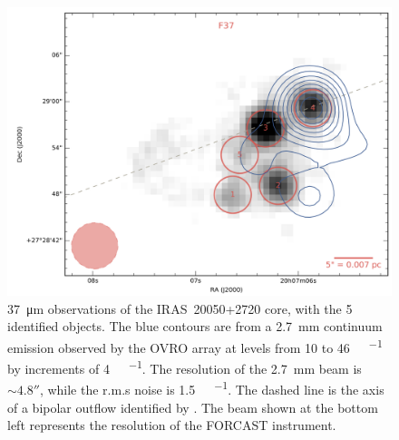 \begin{figure}
\begin{center}
\includegraphics[width=\textwidth]{Figures/IRAS20050_core.png}
\caption[IRAS~20050+2720 core]{\SI{37}{\um} observations of the IRAS~20050+2720 core, with the 5 identified objects. The blue contours are from a \SI{2.7}{\milli\meter} continuum emission observed by the OVRO array \citep{Beltran:2008gu} at levels from 10 to \SI{46}{\milli\Jy\per\beam} by increments of \SI{4}{\milli\Jy\per\beam}. The resolution of the \SI{2.7}{\milli\meter} beam is $\sim\ang{;;4.8}$, while the r.m.s noise is \SI{1.5}{\milli\Jy\per\beam}. The dashed line is the axis of a bipolar outflow identified by \citet{Bachiller:1995cy}. The beam shown at the bottom left represents the resolution of the FORCAST instrument.}
\label{fig:IRAS20050_core}
\end{center}
\end{figure}

